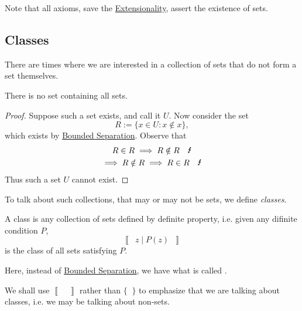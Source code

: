 \documentclass[notoc,notitlepage]{tufte-book}
\newcommand{\class}[1]{\left\llbracket \enspace #1 \enspace \right\rrbracket}
\begin{document}
Note that all axioms, save the \hyperref[axiom:axiom_of_extension]{Extensionality}, assert the existence of sets.


\subsection{Classes}%
\label{sub:classes}

There are times where we are interested in a collection of sets that do not form a set themselves.

\begin{eg}
  There is no set containing all sets.

  \begin{proof}
    Suppose such a set exists, and call it $U$. Now consider the set
    \begin{equation*}
      R := \{ x \in U : x \notin x \},
    \end{equation*}
    which exists by \hyperref[axiom:bounded_separation_axiom]{Bounded Separation}. Observe that
    \begin{gather*}
      R \in R \implies R \notin R \quad \text{\Lightning} \\
      \implies R \notin R \implies R \in R \quad \text{\Lightning}
    \end{gather*}
    Thus such a set $U$ cannot exist.
  \end{proof}
\end{eg}

To talk about such collections, that may or may not be sets, we define \textit{classes}.

\begin{defn}[Class]
\label{defn:class}
  A class is any collection of sets defined by definite property, i.e. given any difinite condition $P$,
  \begin{equation*}
    \class{ z \mid P(z) }
  \end{equation*}
  is the class of all sets satisfying $P$.
\end{defn}

Here, instead of \hyperref[axiom:bounded_separation_axiom]{Bounded Separation}, we have what is called .

\begin{note}
  We shall use $\class{}$ rather than $\{ \; \; \}$ to emphasize that we are talking about classes, i.e. we may be talking about non-sets.
\end{note}
\end{document}
